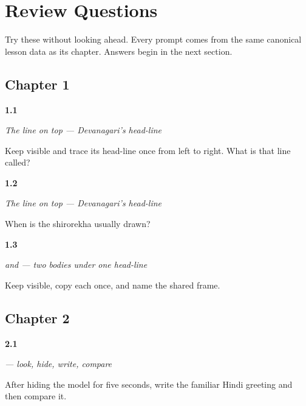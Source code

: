 
\chapter*{Review Questions}

Try these without looking ahead. Every prompt comes from the same canonical lesson data as its chapter. Answers begin in the next section.

\section*{Chapter 1}

\noindent\begin{minipage}[t]{\linewidth}
\raggedright
\hypertarget{review-HI-W01-shirorekha-na-ma-observe-trace}{\textbf{1.1}} \emph{The line on top — Devanagari's head-line}\par
\small Keep  visible and trace its head-line once from left to right. What is that line called?
\end{minipage}\par\medskip

\noindent\begin{minipage}[t]{\linewidth}
\raggedright
\hypertarget{review-HI-W01-shirorekha-na-ma-drawing-order}{\textbf{1.2}} \emph{The line on top — Devanagari's head-line}\par
\small When is the shirorekha usually drawn?
\end{minipage}\par\medskip

\noindent\begin{minipage}[t]{\linewidth}
\raggedright
\hypertarget{review-HI-W01-na-ma-guided-copy}{\textbf{1.3}} \emph{ and  — two bodies under one head-line}\par
\small Keep   visible, copy each once, and name the shared frame.
\end{minipage}\par\medskip

\section*{Chapter 2}

\noindent\begin{minipage}[t]{\linewidth}
\raggedright
\hypertarget{review-HI-W05-namaste-delayed-copy-check}{\textbf{2.1}} \emph{ — look, hide, write, compare}\par
\small After hiding the model for five seconds, write the familiar Hindi greeting and then compare it.
\end{minipage}\par\medskip

